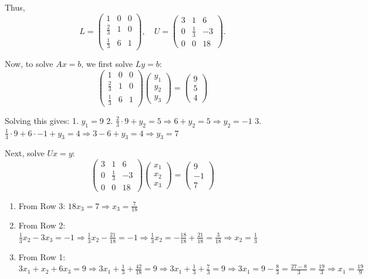 \documentclass[
  letterpaper,
  DIV=11,
  numbers=noendperiod]{scrreprt}
\providecommand{\tightlist}{%
  \setlength{\itemsep}{0pt}\setlength{\parskip}{0pt}}\usepackage{longtable,booktabs,array}
\theoremstyle{plain}
\theoremstyle{definition}
\theoremstyle{remark}
\begin{document}
Thus,
\[ L = \begin{pmatrix} 1 & 0 & 0 \\ \frac{2}{3} & 1 & 0 \\ \frac{1}{3} & 6 & 1 \end{pmatrix}, \quad U = \begin{pmatrix} 3 & 1 & 6 \\ 0 & \frac{1}{3} & -3 \\ 0 & 0 & 18 \end{pmatrix}. \]

Now, to solve \(Ax = b\), we first solve \(Ly = b\):
\[ \begin{pmatrix} 1 & 0 & 0 \\ \frac{2}{3} & 1 & 0 \\ \frac{1}{3} & 6 & 1 \end{pmatrix} \begin{pmatrix} y_1 \\ y_2 \\ y_3 \end{pmatrix} = \begin{pmatrix} 9 \\ 5 \\ 4 \end{pmatrix} \]

Solving this gives: 1. \(y_1 = 9\) 2.
\(\frac{2}{3} \cdot 9 + y_2 = 5 \Rightarrow 6 + y_2 = 5 \Rightarrow y_2 = -1\)
3.
\(\frac{1}{3} \cdot 9 + 6 \cdot -1 + y_3 = 4 \Rightarrow 3 - 6 + y_3 = 4 \Rightarrow y_3 = 7\)

Next, solve \(Ux = y\):
\[ \begin{pmatrix} 3 & 1 & 6 \\ 0 & \frac{1}{3} & -3 \\ 0 & 0 & 18 \end{pmatrix} \begin{pmatrix} x_1 \\ x_2 \\ x_3 \end{pmatrix} = \begin{pmatrix} 9 \\ -1 \\ 7 \end{pmatrix} \]

\begin{enumerate}
\def\labelenumi{\arabic{enumi}.}
\tightlist
\item
  From Row 3: \(18x_3 = 7 \Rightarrow x_3 = \frac{7}{18}\)
\item
  From Row 2:
  \(\frac{1}{3}x_2 - 3x_3 = -1 \Rightarrow \frac{1}{3}x_2 - \frac{21}{18} = -1 \Rightarrow \frac{1}{3}x_2 = -\frac{18}{18} + \frac{21}{18} = \frac{3}{18} \Rightarrow x_2 = \frac{1}{3}\)
\item
  From Row 1:
  \(3x_1 + x_2 + 6x_3 = 9 \Rightarrow 3x_1 + \frac{1}{3} + \frac{42}{18} = 9 \Rightarrow 3x_1 + \frac{1}{3} + \frac{7}{3} = 9 \Rightarrow 3x_1 = 9 - \frac{8}{3} = \frac{27 - 8}{3} = \frac{19}{3} \Rightarrow x_1 = \frac{19}{9}\)
\end{enumerate}
\end{document}
